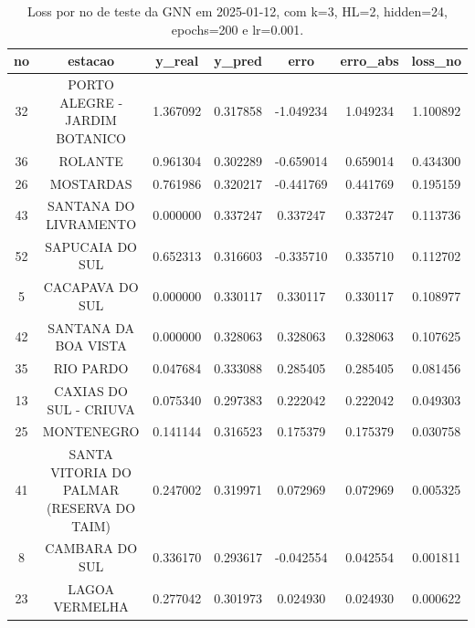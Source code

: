 \begin{table}[h]
\centering
\caption{Loss por no de teste da GNN em 2025-01-12, com k=3, HL=2, hidden=24, epochs=200 e lr=0.001.}
\label{tab:gnn_loss_k3_hl2_h24_e200_d20250112}
\begin{tabular}{ccccccc}
\toprule
no & estacao & y\_real & y\_pred & erro & erro\_abs & loss\_no \\
\midrule
32 & PORTO ALEGRE - JARDIM BOTANICO & 1.367092 & 0.317858 & -1.049234 & 1.049234 & 1.100892 \\
36 & ROLANTE & 0.961304 & 0.302289 & -0.659014 & 0.659014 & 0.434300 \\
26 & MOSTARDAS & 0.761986 & 0.320217 & -0.441769 & 0.441769 & 0.195159 \\
43 & SANTANA DO LIVRAMENTO & 0.000000 & 0.337247 & 0.337247 & 0.337247 & 0.113736 \\
52 & SAPUCAIA DO SUL & 0.652313 & 0.316603 & -0.335710 & 0.335710 & 0.112702 \\
5 & CACAPAVA DO SUL & 0.000000 & 0.330117 & 0.330117 & 0.330117 & 0.108977 \\
42 & SANTANA DA BOA VISTA & 0.000000 & 0.328063 & 0.328063 & 0.328063 & 0.107625 \\
35 & RIO PARDO & 0.047684 & 0.333088 & 0.285405 & 0.285405 & 0.081456 \\
13 & CAXIAS DO SUL - CRIUVA & 0.075340 & 0.297383 & 0.222042 & 0.222042 & 0.049303 \\
25 & MONTENEGRO & 0.141144 & 0.316523 & 0.175379 & 0.175379 & 0.030758 \\
41 & SANTA VITORIA DO PALMAR (RESERVA DO TAIM) & 0.247002 & 0.319971 & 0.072969 & 0.072969 & 0.005325 \\
8 & CAMBARA DO SUL & 0.336170 & 0.293617 & -0.042554 & 0.042554 & 0.001811 \\
23 & LAGOA VERMELHA & 0.277042 & 0.301973 & 0.024930 & 0.024930 & 0.000622 \\
\bottomrule
\end{tabular}
\end{table}
